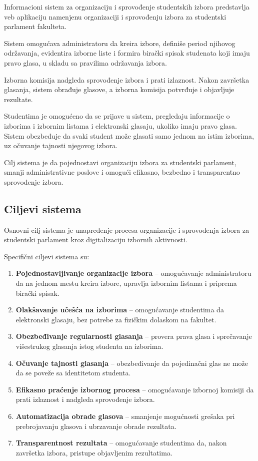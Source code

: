 \documentclass[12pt,a4paper]{article}
\begin{document}
Informacioni sistem za organizaciju i sprovođenje studentskih izbora predstavlja veb aplikaciju namenjenu organizaciji i sprovođenju izbora za studentski parlament fakulteta.

Sistem omogućava administratoru da kreira izbore, definiše period njihovog održavanja, evidentira izborne liste i formira birački spisak studenata koji imaju pravo glasa, u skladu sa pravilima održavanja izbora.

Izborna komisija nadgleda sprovođenje izbora i prati izlaznost. Nakon završetka glasanja, sistem obrađuje glasove, a izborna komisija potvrđuje i objavljuje rezultate.

Studentima je omogućeno da se prijave u sistem, pregledaju informacije o izborima i izbornim listama i elektronski glasaju, ukoliko imaju pravo glasa. Sistem obezbeđuje da svaki student može glasati samo jednom na istim izborima, uz očuvanje tajnosti njegovog izbora.

Cilj sistema je da pojednostavi organizaciju izbora za studentski parlament, smanji administrativne poslove i omogući efikasno, bezbedno i transparentno sprovođenje izbora.

\subsection{Ciljevi sistema}

Osnovni cilj sistema je unapređenje procesa organizacije i sprovođenja izbora za studentski parlament kroz digitalizaciju izbornih aktivnosti.

Specifični ciljevi sistema su:
\begin{enumerate}
    \item \textbf{Pojednostavljivanje organizacije izbora} -- omogućavanje administratoru da na jednom mestu kreira izbore, upravlja izbornim listama i priprema birački spisak.
    \item \textbf{Olakšavanje učešća na izborima} -- omogućavanje studentima da elektronski glasaju, bez potrebe za fizičkim dolaskom na fakultet.
    \item \textbf{Obezbeđivanje regularnosti glasanja} -- provera prava glasa i sprečavanje višestrukog glasanja istog studenta na izborima.
    \item \textbf{Očuvanje tajnosti glasanja} -- obezbeđivanje da pojedinačni glas ne može da se poveže sa identitetom studenta.
    \item \textbf{Efikasno praćenje izbornog procesa} -- omogućavanje izbornoj komisiji da prati izlaznost i nadgleda sprovođenje izbora.
    \item \textbf{Automatizacija obrade glasova} -- smanjenje mogućnosti grešaka pri prebrojavanju glasova i ubrzavanje obrade rezultata.
    \item \textbf{Transparentnost rezultata} -- omogućavanje studentima da, nakon završetka izbora, pristupe objavljenim rezultatima.
\end{enumerate}
\end{document}
